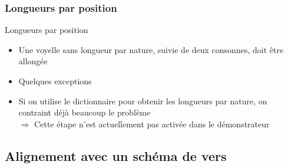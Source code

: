 \documentclass{beamer}
\begin{document}
\subsubsection{Longueurs par position}

\begin{frame}{Longueurs par position}

\begin{itemize}
\item Une voyelle sans longueur par nature, suivie de deux consonnes, doit être allongée
\item Quelques exceptions
\vfill
\item Si on utilise le dictionnaire pour obtenir les longueurs par nature, on contraint déjà beaucoup le problème\\
$\Rightarrow$ Cette étape n'est actuellement pas activée dans le démonstrateur
\end{itemize}
\end{frame} %


\subsection{Alignement avec un schéma de vers}
\end{document}
